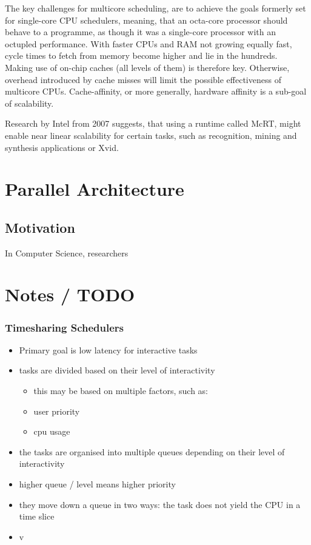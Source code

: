 \documentclass[runningheads]{llncs}
\begin{document}
The key challenges for multicore scheduling, are to achieve the goals formerly set for single-core
CPU schedulers, meaning, that an octa-core processor should behave to a programme, as though it 
was a single-core processor with an octupled performance. With faster CPUs and RAM not growing
equally fast, cycle times to fetch from memory become higher and lie in the hundreds.~\cite{fedorova-phd}
Making use of on-chip caches (all levels of them) is therefore key. Otherwise, overhead introduced
by cache misses will limit the possible effectiveness of multicore CPUs. Cache-affinity, or 
more generally, hardware affinity is a sub-goal of scalability.

Research by Intel from 2007 suggests, that using a runtime called McRT, might enable near linear
scalability for certain tasks, such as recognition, mining and synthesis applications or Xvid.~
\cite{scalability-of-programs-multi-cores}

\section{Parallel Architecture}
\subsection{Motivation}
In Computer Science, researchers 

\section{Notes / TODO}
\subsubsection{Timesharing Schedulers}
\begin{itemize}
    \item Primary goal is low latency for interactive tasks
    \item tasks are divided based on their level of interactivity
    \begin{itemize}
        \item this may be based on multiple factors, such as:
        \item user priority
        \item cpu usage
    \end{itemize}
    \item the tasks are organised into multiple queues depending on their level of interactivity
    \item higher queue / level means higher priority
    \item they move down a queue in two ways: the task does not yield the CPU in a time slice
    \item v
\end{itemize}
\end{document}
